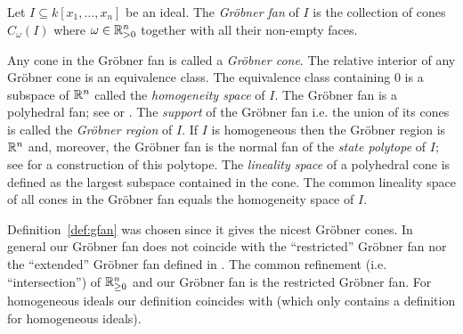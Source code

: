 \begin{definition}\cite[Definition~2.8]{fukuda}
\label{def:gfan}
Let $I\subseteq k[x_1,\dots,x_n]$ be an ideal. The \emph{Gr\"obner fan} of
$I$ is the collection of cones $C_\omega(I)$ where
$\omega\in\mathbb{R}_{>0}^n$ together with all their non-empty faces.
\end{definition}

Any cone in the Gr\"obner fan is called a \emph{Gr\"obner cone}. The
relative interior of any Gr\"obner cone is an equivalence class. The
equivalence class containing $0$ is a subspace of $\mathbb{R}^n$ called
the \emph{homogeneity space} of $I$.  The Gr\"obner fan is a
polyhedral fan; see \cite{sturmfels} or
\cite{fukuda}.  The \emph{support} of the Gr\"obner fan i.e. the union
of its cones is called the \emph{Gr\"obner region} of $I$. If $I$ is
homogeneous then the Gr\"obner region is $\mathbb{R}^n$ and, moreover, the
Gr\"obner fan is the normal fan of the \emph{state polytope} of $I$; see
\cite{sturmfels} for a construction of this polytope.
The \emph{lineality space} of a polyhedral cone is defined as the
largest subspace contained in the cone. The common lineality space of
all cones in the Gr\"obner fan equals the homogeneity space of $I$.

\begin{remark}
Definition~\ref{def:gfan} was chosen since it gives the nicest
Gr\"obner cones. In general our Gr\"obner fan does not coincide with
the ``restricted'' Gr\"obner fan nor the ``extended'' Gr\"obner fan
defined in \cite{MoRo}. The common refinement (i.e. ``intersection'')
of $\mathbb{R}_{\geq 0}^n$ and our Gr\"obner fan is the restricted Gr\"obner
fan. For homogeneous ideals our definition coincides with
\cite[page~13]{sturmfels} (which only contains a definition for homogeneous
ideals).
\end{remark}

